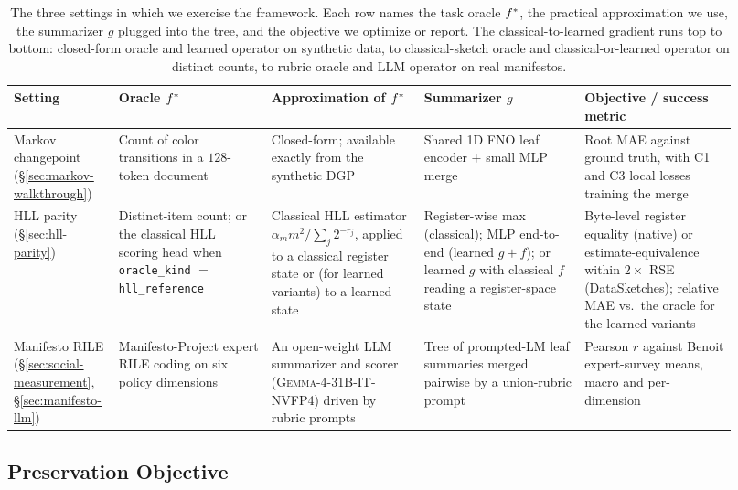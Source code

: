 \begin{table}[t]
\centering\small
\setlength{\tabcolsep}{4pt}
\begin{tabular}{p{0.11\linewidth}p{0.20\linewidth}p{0.20\linewidth}p{0.21\linewidth}p{0.20\linewidth}}
\toprule
Setting & Oracle $f^\ast$ & Approximation of $f^\ast$ & Summarizer $g$ & Objective / success metric \\
\midrule
Markov changepoint (\S\ref{sec:markov-walkthrough}) &
Count of color transitions in a $128$-token document &
Closed-form; available exactly from the synthetic DGP &
Shared 1D FNO leaf encoder $+$ small MLP merge &
Root MAE against ground truth, with C1 and C3 local losses training the merge \\[2pt]
HLL parity (\S\ref{sec:hll-parity}) &
Distinct-item count; or the classical HLL scoring head when \texttt{oracle\_kind} $=$ \texttt{hll\_reference} &
Classical HLL estimator $\alpha_m m^2 / \sum_j 2^{-r_j}$, applied to a classical register state or (for learned variants) to a learned state &
Register-wise max (classical); MLP end-to-end (learned $g{+}f$); or learned $g$ with classical $f$ reading a register-space state &
Byte-level register equality (native) or estimate-equivalence within $2\times$ RSE (DataSketches); relative MAE vs.\ the oracle for the learned variants \\[2pt]
Manifesto RILE (\S\ref{sec:social-measurement}, \S\ref{sec:manifesto-llm}) &
Manifesto-Project expert RILE coding on six policy dimensions &
An open-weight LLM summarizer and scorer (\textsc{Gemma-4-31B-IT-NVFP4}) driven by rubric prompts &
Tree of prompted-LM leaf summaries merged pairwise by a union-rubric prompt &
Pearson $r$ against Benoit expert-survey means, macro and per-dimension \\
\bottomrule
\end{tabular}
\caption{The three settings in which we exercise the framework. Each row names the task oracle $f^\ast$, the practical approximation we use, the summarizer $g$ plugged into the tree, and the objective we optimize or report. The classical-to-learned gradient runs top to bottom: closed-form oracle and learned operator on synthetic data, to classical-sketch oracle and classical-or-learned operator on distinct counts, to rubric oracle and LLM operator on real manifestos.}
\label{tab:settings-comparison}
\end{table}

\subsection{Preservation Objective}

